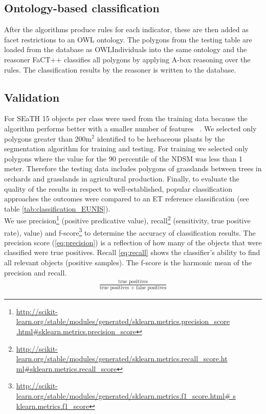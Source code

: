 \documentclass[authoryear,preprint,12pt,number]{elsarticle}
\begin{document}
\subsection{Ontology-based classification}
\label{subsec:Onto_classification}
After the algorithms produce rules for each indicator, these are then added as 
facet restrictions to an OWL ontology. The polygons from the testing table are 
loaded from the database as OWLIndividuals into the same ontology and the 
reasoner FaCT++ classifies all polygons by applying A-box reasoning over the 
rules. The classification results by the reasoner is written to the database. 
\subsection{Validation} 
\label{subsec:Validation}
For SEaTH 
15 objects per class were used from the training data because the algorithm 
performs better with a smaller number of features ~\citep{Nussbaum2006}. We 
selected only polygons greater than 200m$^{2}$ identified to be herbaceous 
plants by the segmentation algorithm for training and testing. For training we 
selected only polygons where the value for the 90 percentile of the NDSM was 
less than 1 meter. Therefore the testing data includes polygons of grasslands 
between trees in orchards and grasslands in agricultural production. Finally, to 
evaluate the quality of the results in respect to well-established, popular 
classification approaches the outcomes were compared to an ET reference 
classification (see table \ref{tab:classification_EUNIS}).
\\
We use precision\footnote{\url{
http://scikit-learn.org/stable/modules/generated/sklearn.metrics.precision_score
.html\#sklearn.metrics.precision\_score}} (positive predicative value), 
recall\footnote{\url{
http://scikit-learn.org/stable/modules/generated/sklearn.metrics.recall_score.ht
ml\#sklearn.metrics.recall\_score}} (sensitivity, true positive rate), 
value) and 
f-score\footnote{\url{
http://scikit-learn.org/stable/modules/generated/sklearn.metrics.f1_score.html\#
s
klearn.metrics.f1\_score}} to determine the accuracy of classification results. 
The precision score (\ref{eq:precision}) is a reflection of how many of the 
objects that were classified were true positives. Recall \ref{eq:recall} shows 
the classifier's ability to find all relevant objects (positive samples). The 
f-score is the harmonic mean of the precision and recall.
\begin{equation}
\begin{align*}
    \frac{\text{true positives}}{\text{true positives + false positives}}
\end{align*}
\label{eq:precision}
\end{equation}
\end{document}
